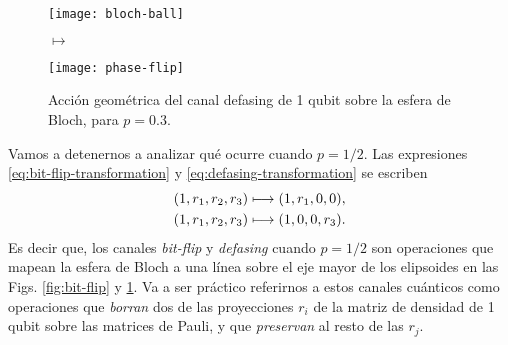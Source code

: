 \begin{figure}
\centering
\begin{minipage}{.4\textwidth}
    \centering
    \texttt{[image: bloch-ball]}
\end{minipage}
\LARGE{$\longmapsto$}
\begin{minipage}{0.4\textwidth}
    \centering
    \texttt{[image: phase-flip]}
\end{minipage}
\caption{
Acción geométrica del canal defasing de 1 qubit sobre la 
esfera de Bloch, para $p=0.3$. \ep}
\label{fig:phase-flip}
\end{figure}
Vamos a detenernos a analizar qué ocurre cuando $p=1/2$. 
Las expresiones \eqref{eq:bit-flip-transformation} y
\eqref{eq:defasing-transformation} se escriben
\begin{align}\label{eq:bit-flip_p=0.5}
\qty(1,r_1,r_2,r_3)&\longmapsto \qty(1,r_1,0,0),\\
\qty(1,r_1,r_2,r_3)&\longmapsto \qty(1,0,0,r_3).\label{eq:defasing_p=0.5}
\end{align}
Es decir que, los canales \textit{bit-flip} y \textit{defasing} cuando $p=1/2$
son operaciones que mapean la esfera de Bloch a una línea sobre 
el eje mayor de los elipsoides en las Figs. \ref{fig:bit-flip} y \ref{fig:phase-flip}.
Va a ser práctico referirnos a estos canales cuánticos 
como operaciones que \textit{borran} dos de las proyecciones
$r_i$  de la matriz de densidad de 1 qubit sobre
las matrices de Pauli, y que \textit{preservan} al resto de las $r_j$.


